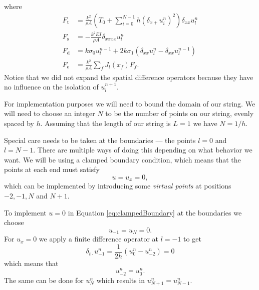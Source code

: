 \documentclass{article}
\begin{document}
where
\begin{align}
  F_\text{t} &= \frac{k^2}{\rho A} \left(T_0 + \sum^{N-1}_{i=0} h(\delta_{x+} u^n_i)^2 \right)\delta_{xx}u_l^n \\
  F_\text{s} &= -\frac{k^2 E I}{\rho A} \delta_{xxxx} u^n_l\\
  F_\text{d} &= k\sigma_0u^{n-1}_l + 2k\sigma_1 (\delta_{xx}u^n_l - \delta_{xx}u^{n-1}_l)\\
  F_\text{e} &= \frac{k^2}{\rho A}\sum_fJ_l(x_f)F_f.
\end{align}
Notice that we did not expand the spatial difference operators because they have no influence on the isolation of $u^{n+1}_l$.

For implementation purposes we will need to bound the domain of our string.
We will need to choose an integer $N$ to be the number of points on our string, evenly spaced by $h$.
Assuming that the length of our string is $L = 1$ we have $N = 1 / h$.

Special care needs to be taken at the boundaries --- the points $l=0$ and $l=N-1$.
There are multiple ways of doing this depending on what behavior we want.
We will be using a clamped boundary condition, which means that the points at each end must satisfy\cite[Chapter~7]{bilbao_numerical_2009}
\begin{equation}
\label{eq:clampedBoundary}
  u = u_x = 0,
\end{equation}
which can be implemented by introducing some \textit{virtual points} at positions $-2, -1, N$ and $N+1$.

To implement $u = 0$ in Equation \eqref{eq:clampedBoundary} at the boundaries we choose
\begin{equation}
  u_{-1} = u_{N} = 0.
\end{equation}
For $u_x = 0$ we apply a finite difference operator at $l = -1$ to get
\begin{equation}
  \delta_{t\cdot} u^n_{-1} = \frac{1}{2h}(u^n_0 - u^n_{-2}) = 0
\end{equation}
which means that
\begin{equation}
  u^n_{-2} = u^n_0.
\end{equation}
The same can be done for $u^n_N$ which results in $u^n_{N+1} = u^n_{N-1}$.

\end{document}
